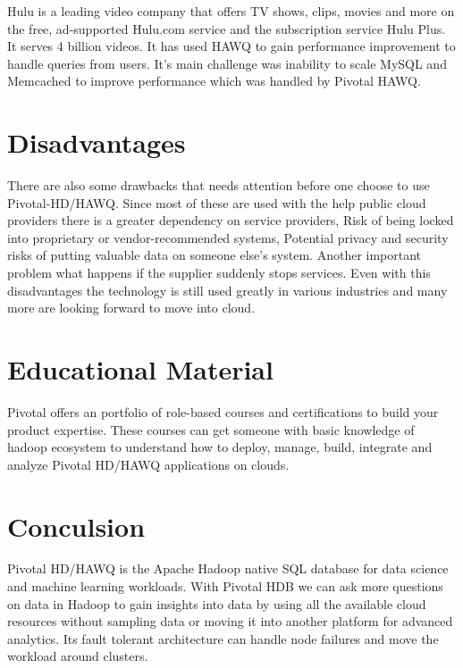 \documentclass[9pt,twocolumn,twoside]{../../styles/osajnl}
\begin{document}
Hulu is a leading video company that offers TV shows, clips, movies
and more on the free, ad-supported Hulu.com service and the
subscription service Hulu Plus. It serves 4 billion videos. It has
used HAWQ to gain performance improvement to handle queries from
users. {It's main challenge was inability to scale MySQL and
Memcached to improve performance which was handled by Pivotal
HAWQ}\cite{www-pivotal-hulu}.


\section{Disadvantages}

There are also some drawbacks that needs attention before one choose to
use Pivotal-HD/HAWQ. Since most of these are used with the help
public cloud providers there is a greater dependency on service
providers,
Risk of being locked into proprietary or vendor-recommended systems,
Potential privacy and security risks of putting valuable data on someone else's system.
Another important problem what happens if the supplier suddenly stops
services. Even with this disadvantages the technology is still used
greatly in various industries and many more are looking forward to
move into cloud.

\section{Educational Material}

{Pivotal offers an portfolio of role-based courses and certifications
to build your product expertise}\cite{www-pivotal-courses}. These
courses can get someone with basic knowledge of hadoop ecosystem  to
understand how to deploy, manage, build, integrate and analyze
Pivotal HD/HAWQ applications on clouds.

\section{Conculsion}

Pivotal HD/HAWQ is the Apache Hadoop native SQL database for data
science and machine learning workloads. With Pivotal HDB we can ask
more questions on data in Hadoop to gain insights into data by using
all the available cloud resources without sampling data or moving it
into another platform for advanced analytics. Its fault tolerant
architecture can handle node failures and move the workload around
clusters.


\end{document}
